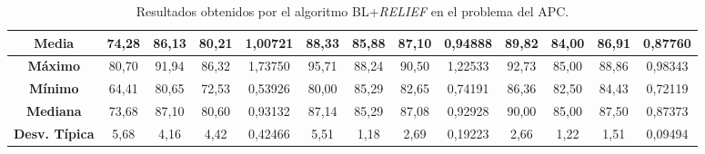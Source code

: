 \documentclass[11pt,a4paper]{article}
\begin{document}
\begin{table}[H]
{\begin{tabular}{c|c|c|c|c|c|c|c|c|c|c|c|c|}
\multicolumn{1}{|c|}{\textbf{Media}}        & 74,28                      & 86,13                   & 80,21                  & 1,00721    & 88,33                      & 85,88                   & 87,10                  & 0,94888    & 89,82                      & 84,00                   & 86,91                  & 0,87760    \\ \hline
\multicolumn{1}{|c|}{\textbf{Máximo}}       & 80,70                      & 91,94                   & 86,32                  & 1,73750    & 95,71                      & 88,24                   & 90,50                  & 1,22533    & 92,73                      & 85,00                   & 88,86                  & 0,98343    \\ \hline
\multicolumn{1}{|c|}{\textbf{Mínimo}}       & 64,41                      & 80,65                   & 72,53                  & 0,53926    & 80,00                      & 85,29                   & 82,65                  & 0,74191    & 86,36                      & 82,50                   & 84,43                  & 0,72119    \\ \hline
\multicolumn{1}{|c|}{\textbf{Mediana}}      & 73,68                      & 87,10                   & 80,60                  & 0,93132    & 87,14                      & 85,29                   & 87,08                  & 0,92928    & 90,00                      & 85,00                   & 87,50                  & 0,87373    \\ \hline
\multicolumn{1}{|c|}{\textbf{Desv. Típica}} & 5,68                       & 4,16                    & 4,42                   & 0,42466    & 5,51                       & 1,18                    & 2,69                   & 0,19223    & 2,66                       & 1,22                    & 1,51                   & 0,09494    \\ \hline
\end{tabular}
}%
\caption{Resultados obtenidos por el algoritmo BL+\textit{RELIEF} en el problema del APC.}
\end{table}
\end{document}
